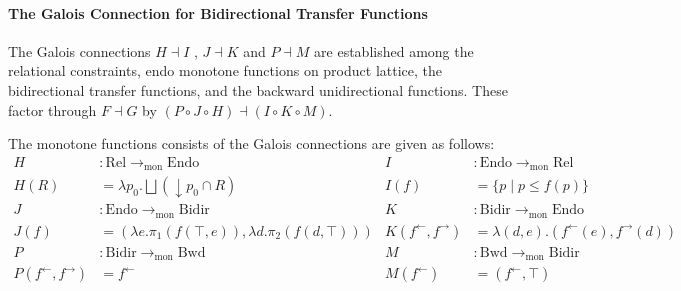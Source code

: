 \documentclass{llncs}
\newcommand{\Pow}{\mathcal{P}}
\newcommand{\Rel}{\mathrm{Rel}}
\newcommand{\Endo}{\mathrm{Endo}}
\newcommand{\Bidir}{\mathrm{Bidir}}
\newcommand{\Unidir}{\mathrm{Bwd}}
\newcommand{\tomon}{\to_{\mathrm{mon}}}
\newcommand{\ff}{{f^{\rightarrow}}}
\newcommand{\fb}{{f^{\leftarrow}}}
\newcommand{\bigjoin}{\bigsqcup}
\newcommand{\comp}{\circ}
\begin{document}
  \paragraph{The Galois Connection for Bidirectional Transfer Functions}
  The Galois connections $H \dashv I$ , $J \dashv K$ and $P \dashv M$ are established among the relational constraints, endo monotone functions on product lattice, the bidirectional transfer functions, and the backward unidirectional functions. These factor through $F \dashv G$ by $(P \comp J \comp H) \dashv (I \comp K \comp M)$.
  \begin{center}
  \end{center}
  The monotone functions consists of the Galois connections are given as follows:
  \begin{align*}
    H &: \Rel \tomon \Endo &
    I &: \Endo \tomon \Rel \\
    H(R) &= \lambda p_{0} . \bigjoin (\downarrow p_{0} \cap R) &
    I(f) &= \{p \mid p \leq f(p)\} \\
    J &: \Endo \tomon \Bidir &
    K &: \Bidir \tomon \Endo \\
    J(f) &= (\lambda e . \pi_{1} (f (\top , e )) , \lambda d . \pi_{2} (f (d , \top))) &
    K(\fb , \ff) &= \lambda (d , e) . (\fb(e) , \ff(d)) \\
    P &: \Bidir \tomon \Unidir &
    M &: \Unidir \tomon \Bidir \\
    P(\fb , \ff) &= \fb &
    M(\fb) &= (\fb , \top)
  \end{align*}
\end{document}
